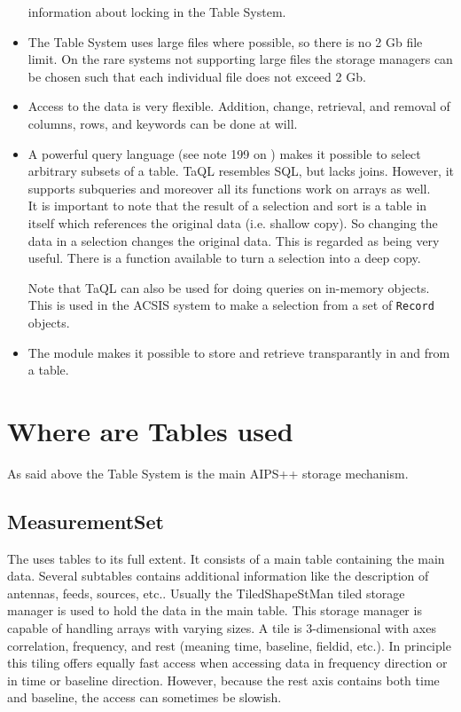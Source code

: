 \begin{itemize}
information about locking in the Table System.
\item The Table System uses large files where possible, so there is
no 2 Gb file limit. On the rare systems not supporting large files
the storage managers can be chosen such that each individual file does
not exceed 2 Gb.
\item
Access to the data is very flexible.
Addition, change, retrieval, and removal of columns, rows, and
keywords can be done at will. 
\item
A powerful query language (see note 199 on
) makes it possible to
select arbitrary subsets of a table. TaQL resembles SQL, but lacks joins.
However, it supports subqueries and moreover all its functions
work on arrays as well.
\\It is important to note that the result of a selection and sort is a table
in itself which references the original data (i.e. shallow copy).
So changing the data in a
selection changes the original data. This is regarded as being very useful.
There is a function available to turn a selection into a deep copy.

Note that TaQL can also be used for doing queries on in-memory objects.
This is used in the ACSIS system to make a selection from a set of
\texttt{Record} objects.

\item
The 
module makes it possible to store and retrieve
transparantly in and from a table.
\end{itemize}

\section{Where are Tables used}
As said above the Table System is the main AIPS++ storage mechanism.
\subsection{MeasurementSet}
The  uses tables to
its full extent. It consists of a main table containing the main data.
Several subtables contains additional information like the description
of antennas, feeds, sources, etc..
Usually the TiledShapeStMan tiled storage manager is used to hold the
data in the main table. This storage manager is capable of handling
arrays with varying sizes. A tile is 3-dimensional with axes 
correlation, frequency, and rest (meaning time, baseline, fieldid,
etc.). In principle this tiling offers equally fast access when
accessing data in frequency direction or in time or baseline
direction. However, because the rest axis contains both time and
baseline, the access can sometimes be slowish.

